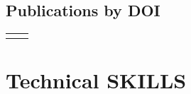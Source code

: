 \documentclass[
	10pt, %
	]{FreemanCV}
\begin{document}
\begin{paracol}{2}




\subsection{Publications by DOI}

\begin{supertabular}{r l} %
	
	
	
	
\end{supertabular}

\medskip %


\section{Technical SKILLS}




\begin{supertabular}{r l} %
	

\end{supertabular}
\end{paracol}
\end{document}
